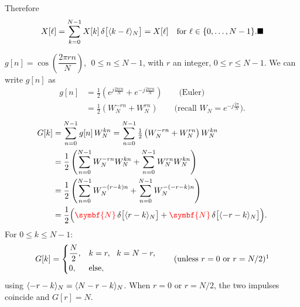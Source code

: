 \documentclass[handout_subfiles_root.tex]{subfiles}
\begin{document}
\noindent Therefore
\begin{equation*}
X[\ell] = \sum_{k=0}^{N-1} X[k]\,\delta\big[\HandoutMod{k-\ell}{N}\big] = X[\ell] \quad \text{for } \ell\in\{0,\dots,N-1\}. \HandoutQEDhfillMath
\end{equation*}

\begin{examplebox}[title={Example}, handout mark=4]
$g[n] = \cos\!\left(\dfrac{2\pi rn}{N}\right)$, $\;0\le n\le N-1$, with $r$ an integer, $0\le r\le N-1$.
\noindent We can write $g[n]$ as
\begin{align*}
g[n] &= \tfrac{1}{2}\left(e^{j\frac{2\pi rn}{N}} + e^{-j\frac{2\pi rn}{N}}\right)
\qquad\text{(Euler)} \\
&= \tfrac{1}{2}\left(W_N^{-rn} + W_N^{rn}\right)
\qquad\text{(recall $W_N=e^{-j\frac{2\pi}{N}}$)}.
\end{align*}
\begin{align*}
G[k] &= \sum_{n=0}^{N-1} g[n]\,W_N^{kn}
= \sum_{n=0}^{N-1} \tfrac{1}{2}\left(W_N^{-rn} + W_N^{rn}\right) W_N^{kn} \\
&= \frac{1}{2}\left(\sum_{n=0}^{N-1} W_N^{-rn} W_N^{kn} + \sum_{n=0}^{N-1} W_N^{rn} W_N^{kn}\right) \\
&= \frac{1}{2}\left(\sum_{n=0}^{N-1} W_N^{-(r-k)n} + \sum_{n=0}^{N-1} W_N^{-(-r-k)n}\right) \\
&= \frac{1}{2}\Big(\textcolor{red}{\symbf{N}}\,\delta\big[\HandoutMod{r-k}{N}\big] + \textcolor{red}{\symbf{N}}\,\delta\big[\HandoutMod{-r-k}{N}\big]\Big).
\end{align*}
For $0\le k\le N-1$:
\begin{equation*}
G[k] = \begin{cases} \dfrac{N}{2}, & k = r,\ \ k = N-r, \\[4pt] 0, & \text{else}, \end{cases}
\qquad \text{(unless $r=0$ or $r=N/2$)}\footnotemark{}
\end{equation*}
using $\langle -r-k\rangle_{N} = \langle N-r-k\rangle_{N}$. When $r=0$ or $r=N/2$, the two impulses coincide and $G[r] = N$.
\end{examplebox}
\end{document}
